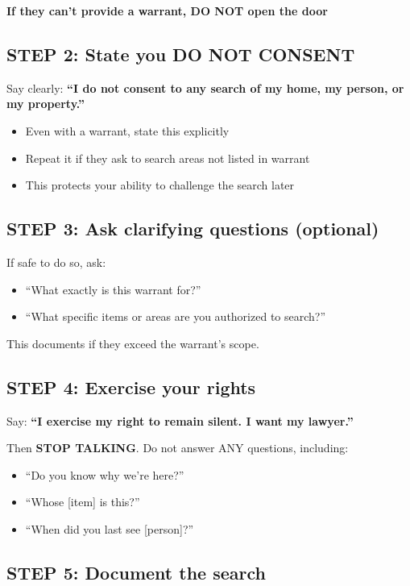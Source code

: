 \documentclass[10pt,letterpaper,twocolumn]{article}
\begin{document}
\noindent \textbf{If they can't provide a warrant, DO NOT open the door}

\subsection{STEP 2: State you DO NOT CONSENT}

Say clearly: \textbf{``I do not consent to any search of my home, my person, or my property.''}

\begin{itemize}[leftmargin=*]
    \item Even with a warrant, state this explicitly
    \item Repeat it if they ask to search areas not listed in warrant
    \item This protects your ability to challenge the search later
\end{itemize}

\subsection{STEP 3: Ask clarifying questions (optional)}

If safe to do so, ask:
\begin{itemize}[leftmargin=*]
    \item ``What exactly is this warrant for?''
    \item ``What specific items or areas are you authorized to search?''
\end{itemize}

\noindent This documents if they exceed the warrant's scope.

\subsection{STEP 4: Exercise your rights}

Say: \textbf{``I exercise my right to remain silent. I want my lawyer.''}

\noindent Then \textbf{STOP TALKING}. Do not answer ANY questions, including:
\begin{itemize}[leftmargin=*]
    \item ``Do you know why we're here?''
    \item ``Whose [item] is this?''
    \item ``When did you last see [person]?''
\end{itemize}

\subsection{STEP 5: Document the search}
\end{document}
